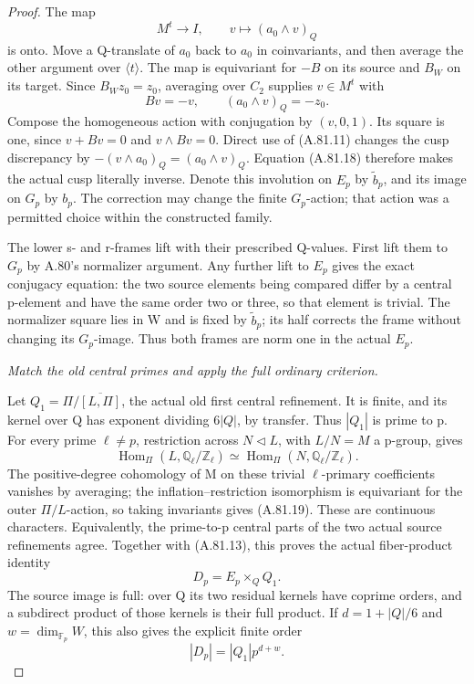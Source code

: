 \begin{proof}
The map
\[
                 M^t\longrightarrow I,
                 \qquad v\longmapsto(a_0\wedge v)_Q
 \tag{A.81.17}
\]
is onto. Move a Q-translate of \(a_0\) back to
\(a_0\) in coinvariants, and then average the other
argument over \(\langle t\rangle\). The map is
equivariant for \(-B\) on its source and \(B_W\)
on its target. Since \(B_Wz_0=z_0\), averaging
over \(C_2\) supplies \(v\in M^t\) with
\[
                         Bv=-v,
                 \qquad (a_0\wedge v)_Q=-z_0.
 \tag{A.81.18}
\]
Compose the homogeneous action with conjugation by
\((v,0,1)\). Its square is one, since
\(v+Bv=0\) and \(v\wedge Bv=0\). Direct use of
(A.81.11) changes the cusp discrepancy by
\(-(v\wedge a_0)_Q=(a_0\wedge v)_Q\).
Equation (A.81.18) therefore makes the actual cusp
literally inverse. Denote this involution on \(E_p\)
by \(\widetilde b_p\), and its image on \(G_p\)
by \(b_p\). The correction may change the finite
\(G_p\)-action; that action was a permitted choice
within the constructed family.

The lower s- and r-frames lift with their prescribed
Q-values. First lift them to \(G_p\) by A.80's
normalizer argument. Any further lift to \(E_p\)
gives the exact conjugacy equation: the two source
elements being compared differ by a central p-element
and have the same order two or three, so that element
is trivial. The normalizer square lies in W and is
fixed by \(\widetilde b_p\); its half corrects the
frame without changing its \(G_p\)-image. Thus both
frames are norm one in the actual \(E_p\).

\emph{Match the old central primes and apply the full
ordinary criterion.}\par
Let \(Q_1=\Pi/\overline{[L,\Pi]}\), the actual
old first central refinement. It is finite, and its
kernel over Q has exponent dividing \(6|Q|\), by
transfer. Thus \(|Q_1|\) is prime to p. For every
prime \(\ell\ne p\), restriction across
\(N\lhd L\), with \(L/N=M\) a p-group, gives
\[
 \operatorname{Hom}_\Pi(L,\mathbb Q_\ell/\mathbb Z_\ell)
       \simeq
 \operatorname{Hom}_\Pi(N,\mathbb Q_\ell/\mathbb Z_\ell).
 \tag{A.81.19}
\]
The positive-degree cohomology of M on these trivial
\(\ell\)-primary coefficients vanishes by averaging;
the inflation--restriction isomorphism is equivariant
for the outer \(\Pi/L\)-action, so taking invariants
gives (A.81.19). These are continuous characters.
Equivalently, the prime-to-p central parts of the two
actual source refinements agree. Together with
(A.81.13), this proves the actual fiber-product identity
\[
                         D_p=E_p\times_Q Q_1.
 \tag{A.81.20}
\]
The source image is full: over Q its two residual
kernels have coprime orders, and a subdirect product
of those kernels is their full product. If
\(d=1+|Q|/6\) and \(w=\dim_{\mathbb F_p}W\), this
also gives the explicit finite order
\[
                              |D_p|=|Q_1|p^{d+w}.
 \tag{A.81.21}
\]


\end{proof}
